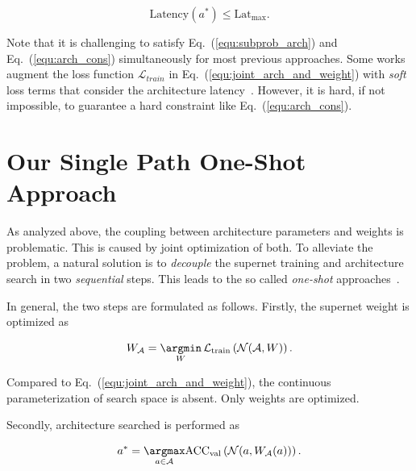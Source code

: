 \begin{equation}
\text{Latency}(a^*) \le \text{Lat}_{\text{max}}.
\label{equ:arch_cons}
\end{equation}

Note that it is challenging to satisfy Eq.~(\ref{equ:subprob_arch}) and Eq.~(\ref{equ:arch_cons}) simultaneously for most previous approaches. Some works augment the loss function $\mathcal{L}_{train}$ in Eq.~(\ref{equ:joint_arch_and_weight}) with \emph{soft} loss terms that consider the architecture latency~\cite{cai2018proxylessnas,wu2018fbnet,xie2018snas,veniat2018learning}. However, it is hard, if not impossible, to guarantee a hard constraint like Eq.~(\ref{equ:arch_cons}).

\section{Our Single Path One-Shot Approach}
\label{sec:our_approach}

As analyzed above, the coupling between architecture parameters and weights  is problematic. This is caused by joint optimization of both. To alleviate the problem, a natural solution is to \emph{decouple} the supernet training and architecture search in two \emph{sequential} steps. This leads to the so called \emph{one-shot} approaches~\cite{brock2017smash,bender2018understanding}.

In general, the two steps are formulated as follows. Firstly, the supernet weight is optimized as

\begin{equation}
    W_\mathcal{A} = \mathop{\argmin}_W \mathcal{L}_\text{train} \left( \mathcal{N}(\mathcal{A}, W) \right).
\label{equ:supernet_oneshot}
\end{equation}

Compared to Eq.~(\ref{equ:joint_arch_and_weight}), the continuous parameterization of search space is absent. Only weights are optimized.

Secondly, architecture searched is performed as

\begin{equation}
\begin{split}
    a^* = \mathop{\argmax}_{a\in \mathcal{A}} &\text{ACC}_\text{val} \left( \mathcal{N} (a, W_\mathcal{A}(a)) \right).\\

\end{split}
\label{equ:arch_search_oneshot}
\end{equation}

